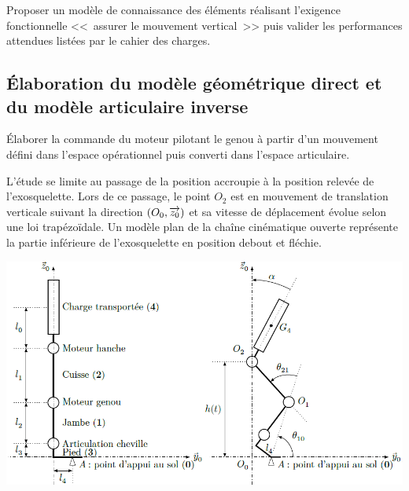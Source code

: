 \documentclass[10pt,fleqn]{article} %
\begin{document}
\begin{multicols}{2}
\fi
\begin{obj}
Proposer un modèle de connaissance des éléments réalisant l’exigence fonctionnelle <<~assurer le mouvement vertical~>> puis valider les performances attendues listées par le cahier des charges.
\end{obj}



\subsection*{Élaboration du modèle géométrique direct et du modèle articulaire inverse}
\begin{obj}
Élaborer la commande du moteur pilotant le genou à partir d’un mouvement défini dans l’espace
opérationnel puis converti dans l’espace articulaire.
\end{obj}

\ifprof
\else
L’étude se limite au passage de la position accroupie à la position relevée de l’exosquelette. Lors de ce passage,
le point $O_2$ est en mouvement de translation verticale suivant la direction $\left(O_0,\overrightarrow{{z_0}}\right)$ et sa vitesse de déplacement
évolue selon une loi trapézoïdale. Un modèle plan de la chaîne cinématique ouverte représente la partie inférieure
de l’exosquelette en position debout et fléchie.


\begin{center}
\includegraphics[width=\linewidth]{images/fig_03}
\end{center}





\end{multicols}
\end{document}
